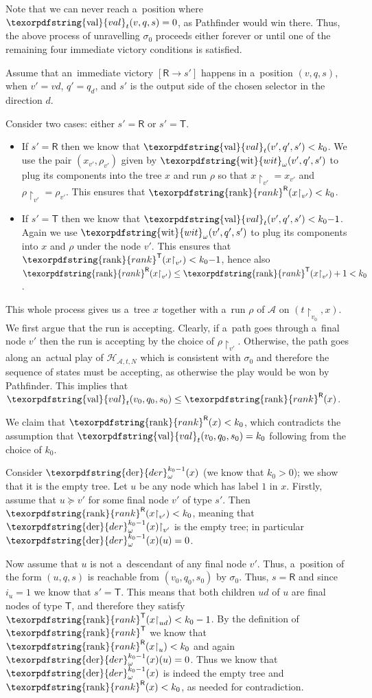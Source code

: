 \documentclass[11pt,a4paper]{amsart}
\theoremstyle{plain}
\theoremstyle{definition}
\theoremstyle{defC}
\theoremstyle{thmC}
\theoremstyle{plain}
\numberwithin{equation}{section}
\numberwithin{equation}{section}
\numberwithin{figure}{section}
\newcommand{\ident}[1]{\ensuremath{\texorpdfstring{\mathrm{\mathnm{#1}}}{#1}}\xspace}
\newcommand{\mathcalsym}[1]{\ensuremath{\mathcal{#1}}\xspace}
\newcommand{\CA}{\mathcalsym{A}}
\newcommand{\CH}{\mathcalsym{H}}
\newcommand{\mathnm}[1]{#1}
\newcommand{\restr}{{\upharpoonright}}
\newcommand{\val}{\ident{val}}
\newcommand{\der}{\ident{der}}
\newcommand{\sT}{\mathsf{T}}
\newcommand{\sR}{\mathsf{R}}
\newcommand{\rankR}{\ident{rank}^\sR}
\newcommand{\rankT}{\ident{rank}^\sT}
\newcommand{\imwin}[2]{[#1\to #2]}
\newcommand{\wit}{\ident{wit}_\omega}
\newcommand{\derF}{\der_\omega}
\begin{document}
Note that we can never reach a~position where $\val_t(v,q,s)=0$, as Pathfinder would win there.
Thus, the above process of unravelling $\sigma_0$ proceeds either forever or until one of the remaining four immediate victory conditions is satisfied.

Assume that an~immediate victory $\imwin{\sR}{s'}$ happens in a~position $(v,q,s)$, when $v'=vd$, $q'=q_d$, and $s'$ is the output side of the chosen selector in the direction $d$.

Consider two cases: either $s'=\sR$ or $s'=\sT$.
\begin{itemize}
\item	If $s'=\sR$ then we know that $\val_t(v',q',s')<k_0$. We use the pair $(x_{v'},\rho_{v'})$ given by $\wit(v',q',s')$ to plug its components into the tree $x$ and run $\rho$
	so that $x\restr_{v'}=x_{v'}$ and $\rho\restr_{v'}=\rho_{v'}$.
	This ensures that $\rankR(x\restr_{v'})<k_0$.
\item	If $s'=\sT$ then we know that $\val_t(v',q',s')<k_0{-}1$.
	Again we use $\wit(v',q',s')$ to plug its components into $x$ and $\rho$ under the node $v'$.
	This ensures that $\rankT(x\restr_{v'})<k_0{-}1$, hence also $\rankR(x\restr_{v'})\leq\rankT(x\restr_{v'})+1<k_0$.
\end{itemize}
\noindent %
This whole process gives us a~tree $x$ together with a~run $\rho$ of $\CA$ on $(t\restr_{v_0},x)$.
We first argue that the run is accepting.
Clearly, if a~path goes through a~final node $v'$ then the run is accepting by the choice of $\rho\restr_{v'}$.
Otherwise, the path goes along an~actual play of $\CH_{\CA,t,N}$ which is consistent with $\sigma_0$ and therefore the sequence of states must be accepting,
as otherwise the play would be won by Pathfinder.
This implies that $\val_t(v_0,q_0,s_0)\leq\rankR(x)$.

We claim that $\rankR(x)< k_0$, which contradicts the assumption that $\val_t(v_0,q_0,s_0)= k_0$ following from the choice of $k_0$.

Consider $\derF^{k_0-1}(x)$ (we know that $k_0>0$); we show that it is the empty tree.
Let $u$ be any node which has label $1$ in $x$.
Firstly, assume that $u\succeq v'$ for some final node $v'$ of type $s'$.
Then $\rankR(x\restr_{v'})<k_0$, meaning that $\derF^{k_0-1}(x)\restr_{v'}$ is the empty tree; in particular $\derF^{k_0-1}(x)(u)=0$.

Now assume that $u$ is not a~descendant of any final node $v'$.
Thus, a~position of the form $(u,q,s)$ is reachable from $(v_0,q_0,s_0)$ by $\sigma_0$.
Thus, $s=\sR$ and since $i_u=1$ we know that $s'=\sT$.
This means that both children $ud$ of $u$ are final nodes of type $\sT$, and therefore they satisfy $\rankT(x\restr_{ud})< k_0-1$.
By the definition of $\rankT$ we know that $\rankR(x\restr_u)< k_0$ and again $\derF^{k_0-1}(x)(u)=0$.
Thus we know that $\derF^{k_0-1}(x)$ is indeed the empty tree and $\rankR(x)< k_0$, as needed for contradiction.
\end{document}
